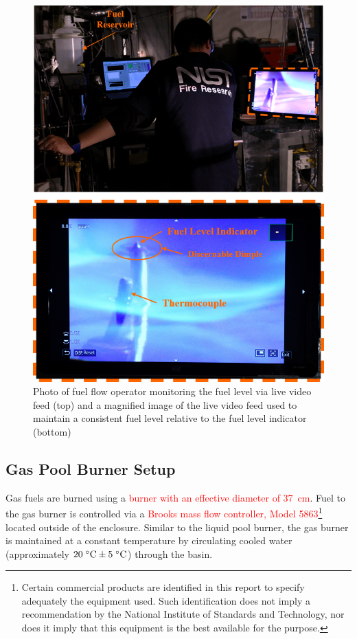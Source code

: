 \documentclass[12pt]{article}
\begin{document}
\begin{figure}[h!]
	\centering
\includegraphics[width=14.0cm,keepaspectratio]{Monitoring_Fuel_Level_A.png}
	\caption[Photographs of the fuel monitoring process]{Photo of fuel flow operator monitoring the fuel level via live video feed (top) and a magnified image of the live video feed used to maintain a consistent fuel level relative to the fuel level indicator (bottom)}
	\label{fig:Fuel_Level}
\end{figure}

\subsection{Gas Pool Burner Setup}
\label{ssec:Gas_Pool_Burner_Setup}
Gas fuels are burned using a \textcolor{red}{burner with an effective diameter of 37~cm}. Fuel to the gas burner is controlled via a \textcolor{red}{Brooks mass flow controller, Model 5863}\footnote{\label{fn:product} Certain commercial products are identified in this report to specify adequately the equipment used. Such identification does not imply a recommendation by the National Institute of Standards and Technology, nor does it imply that this equipment is the best available for the purpose.} located outside of the enclosure. Similar to the liquid pool burner, the gas burner is maintained at a constant temperature by circulating cooled water (approximately $20 \; ^\circ \hbox{C} \pm 5 \; ^\circ \hbox{C}$) through the basin.
\end{document}
